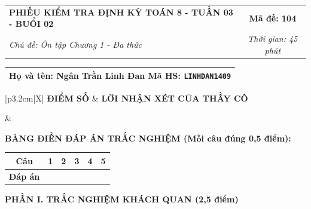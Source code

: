 \documentclass[12pt,a4paper]{article}
\begin{document}
\newpage


\noindent
\begin{tabularx}{\linewidth}{|X|c|}
\hline
\textbf{PHIẾU KIỂM TRA ĐỊNH KỲ TOÁN 8 - TUẦN 03 - BUỔI 02} & \textbf{Mã đề: 104} \\
\textit{Chủ đề: Ôn tập Chương 1 - Đa thức} & \textit{Thời gian: 45 phút} \\
\hline
\end{tabularx}

\vspace{1mm}

\noindent
\begin{tabularx}{\linewidth}{|X|}
\hline
\rule[-2mm]{0pt}{7.5mm}\textbf{Họ và tên:} \textbf{\large Ngân Trần Linh Đan} \hfill \textbf{Mã HS:} \texttt{LINHDAN1409} \quad \\
\hline
\end{tabularx}

\vspace{1mm}

\noindent
\begin{tabularx}{\linewidth}{|p{3.2cm}|X|}
\hline
\centering\textbf{ĐIỂM SỐ} & \centering\textbf{LỜI NHẬN XÉT CỦA THẦY CÔ} \tabularnewline
\hline
\rule{0pt}{1.3cm} & \tabularnewline
\hline
\end{tabularx}

\vspace{1.2mm}

\noindent\textbf{BẢNG ĐIỀN ĐÁP ÁN TRẮC NGHIỆM (Mỗi câu đúng 0,5 điểm):}
\vspace{0.8mm}

\noindent
\renewcommand{\arraystretch}{1.35}
\begin{tabularx}{\linewidth}{|c|*{5}{>{\centering\arraybackslash}X|}}
\hline
\textbf{Câu} & \textbf{1} & \textbf{2} & \textbf{3} & \textbf{4} & \textbf{5} \\
\hline
\textbf{Đáp án} & & & & & \\
\hline
\end{tabularx}
\renewcommand{\arraystretch}{1.0}

\vspace{1.5mm}

\noindent\textbf{\large PHẦN I. TRẮC NGHIỆM KHÁCH QUAN (2,5 điểm)}
\vspace{1mm}
\end{document}
